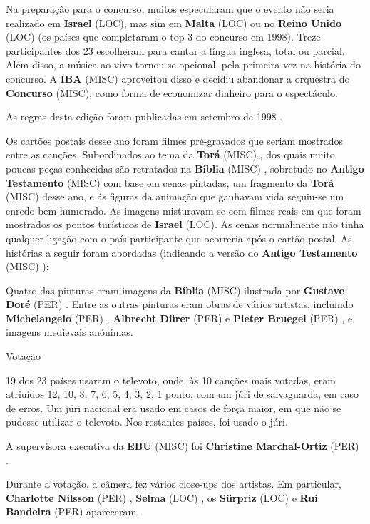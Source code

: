 \documentclass[12pt,a4paper]{article}
\begin{document}
Na preparação para o concurso, muitos especularam que o evento não seria realizado em \textbf{Israel} (LOC), mas sim em \textbf{Malta} (LOC) ou no \textbf{Reino Unido} (LOC) (os países que completaram o top 3 do concurso em 1998). Treze participantes dos 23 escolheram para cantar a língua inglesa, total ou parcial. Além disso, a música ao vivo tornou-se opcional, pela primeira vez na história do concurso. A \textbf{IBA} (MISC) aproveitou disso e decidiu abandonar a orquestra do \textbf{Concurso} (MISC), como forma de economizar dinheiro para o espectáculo.

As regras desta edição foram publicadas em setembro de 1998 .

Os cartões postais desse ano foram filmes pré-gravados que seriam mostrados entre as canções. Subordinados ao tema da \textbf{Torá} (MISC) , dos quais muito poucas peças conhecidas são retratados na \textbf{Bíblia} (MISC) , sobretudo no \textbf{Antigo Testamento} (MISC) com base em cenas pintadas, um fragmento da \textbf{Torá} (MISC) desse ano, e ás figuras da animação que ganhavam vida seguiu-se um enredo bem-humorado. As imagens misturavam-se com filmes reais em que foram mostrados os pontos turísticos de \textbf{Israel} (LOC). As cenas normalmente não tinha qualquer ligação com o país participante que ocorreria após o cartão postal. As histórias a seguir foram abordadas (indicando a versão do \textbf{Antigo Testamento} (MISC) ):

Quatro das pinturas eram imagens da \textbf{Bíblia} (MISC) ilustrada por \textbf{Gustave Doré} (PER) . Entre as outras pinturas eram obras de vários artistas, incluindo \textbf{Michelangelo} (PER) , \textbf{Albrecht Dürer} (PER) e \textbf{Pieter Bruegel} (PER) , e imagens medievais anónimas.



Votação

19 dos 23 países usaram o televoto, onde, às 10 canções mais votadas, eram atriuídos 12, 10, 8, 7, 6, 5, 4, 3, 2, 1 ponto, com um júri de salvaguarda, em caso de erros. Um júri nacional era usado em casos de força maior, em que não se pudesse utilizar o televoto. Nos restantes países, foi usado o júri.

A supervisora executiva da \textbf{EBU} (MISC) foi \textbf{Christine Marchal-Ortiz} (PER) .

Durante a votação, a câmera fez vários close-ups dos artistas. Em particular, \textbf{Charlotte Nilsson} (PER) , \textbf{Selma} (LOC) , os \textbf{Sürpriz} (LOC) e \textbf{Rui Bandeira} (PER) apareceram.
\end{document}
